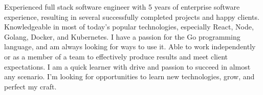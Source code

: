 

\begin{cvparagraph}

Experienced full stack software engineer with 5 years of enterprise software experience, resulting in several successfully completed projects and happy clients. Knowledgeable in most of today's popular technologies, especially React, Node, Golang, Docker, and Kubernetes. I have a passion for the Go programming language, and am always looking for ways to use it. Able to work independently or as a member of a team to effectively produce results and meet client expectations. I am a quick learner with drive and passion to succeed in almost any scenario. I’m looking for opportunities to learn new technologies, grow, and perfect my craft.
\end{cvparagraph}
